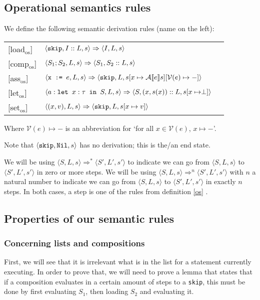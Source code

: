 \subsection{Operational semantics rules}
\begin{definition} 
\label{os}
We define the following semantic derivation rules (name on the left):

\begin{tabular}{p{5em}p{18em}p{13em}}
[load$_{\textrm{os}}$] &
\centering$\langle \texttt{skip}, I::L, s \rangle \Rightarrow \langle I, L, s \rangle$ & \medskip\\

[comp$_{\textrm{os}}$] &
\centering$\langle S_1; S_2, L, s \rangle \Rightarrow \langle S_1, S_2::L, s \rangle$ & \medskip\\

[ass$_{\textrm{os}}$] &
\centering $\langle \texttt{x := } e, L, s \rangle \Rightarrow \langle \texttt{skip}, L, s[x \mapsto \mathcal{A} \llbracket e \rrbracket s][\mathcal{V}(e)\mapsto-] \rangle$ & \medskip\\

[let$_{\textrm{os}}$] &
\centering $\langle a : \texttt{let }x : \tau \texttt{ in } S, L, s \rangle \Rightarrow \langle S, (x,s(x))::L, s[x\mapsto \perp] \rangle$ & \medskip\\

[set$_{\textrm{os}}$] &
\centering$\langle (x,v), L, s \rangle \Rightarrow \langle \texttt{skip}, L, s[x\mapsto v] \rangle$ & \medskip\\
\end{tabular} 
Where $\mathcal{V}(e)\mapsto-$ is an abbreviation for `for all $x \in \mathcal{V}(e)$, $x \mapsto -$'.
\end{definition} 
Note that $\langle \texttt{skip}, \texttt{Nil}, s \rangle$ has no derivation; this is the/an end state. 

We will be using $\langle S, L, s \rangle \Rightarrow ^{*} \langle S', L', s' \rangle$ to indicate we can go from $\langle S, L, s \rangle$ to $\langle S', L', s' \rangle$ in zero or more steps. We will be using $\langle S, L, s \rangle \Rightarrow ^{n} \langle S', L', s' \rangle$ with $n$ a natural number to indicate we can go from $\langle S, L, s \rangle$ to $\langle S', L', s' \rangle$ in exactly $n$ steps. In both cases, a step is one of the rules from definition \ref{os} .


\subsection{Properties of our semantic rules}

\subsubsection*{Concerning lists and compositions}
First, we will see that it is irrelevant what is in the list for a statement currently executing. In order to prove that, we will need to prove a lemma that states that if a composition evaluates in a certain amount of steps to a \texttt{skip}, this must be done by first evaluating $S_1$, then loading $S_2$ and evaluating it. 

